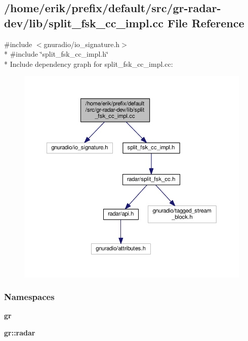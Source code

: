 \subsection{/home/erik/prefix/default/src/gr-\/radar-\/dev/lib/split\+\_\+fsk\+\_\+cc\+\_\+impl.cc File Reference}
\label{split__fsk__cc__impl_8cc}
{\ttfamily \#include $<$gnuradio/io\+\_\+signature.\+h$>$}\\*
{\ttfamily \#include \char`\"{}split\+\_\+fsk\+\_\+cc\+\_\+impl.\+h\char`\"{}}\\*
Include dependency graph for split\+\_\+fsk\+\_\+cc\+\_\+impl.\+cc\+:
\nopagebreak
\begin{figure}[H]
\begin{center}
\leavevmode
\includegraphics[width=350pt]{db/dd7/split__fsk__cc__impl_8cc__incl}
\end{center}
\end{figure}
\subsubsection*{Namespaces}
\begin{DoxyCompactItemize}
\item 
 {\bf gr}
\item 
 {\bf gr\+::radar}
\end{DoxyCompactItemize}
